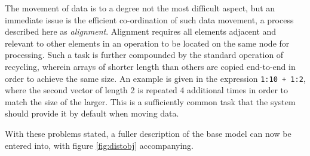 \documentclass[a4paper,10pt]{article}
\begin{document}
The movement of data is to a degree not the most difficult aspect, but an
immediate issue is the efficient co-ordination of such data movement, a process
described here as \textit{alignment}.
Alignment requires all elements adjacent and relevant to other elements in an
operation to be located on the same node for processing.
Such a task is further compounded by the standard operation of recycling,
wherein arrays of shorter length than others are copied end-to-end in order to
achieve the same size.
An example is given in the expression \texttt{1:10 + 1:2}, where
the second vector of length 2 is repeated 4 additional times in order to match
the size of the larger.
This is a sufficiently common task that the system should provide it by default
when moving data.

With these problems stated, a fuller description of the base model can now be
entered into, with figure \ref{fig:distobj} accompanying.
\end{document}
